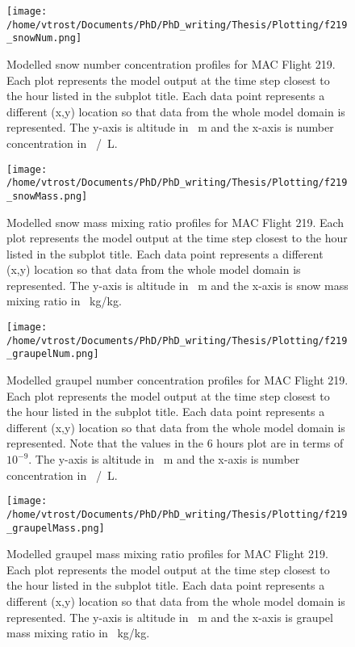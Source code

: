 \begin{figure}[H]
	\centering
	\texttt{[image: /home/vtrost/Documents/PhD/PhD\_writing/Thesis/Plotting/f219\_snowNum.png]}
	\caption{Modelled snow number concentration profiles for MAC Flight 219. Each plot represents the model output at the time step closest to the hour listed in the subplot title. Each data point represents a different (x,y) location so that data from the whole model domain is represented. The y-axis is altitude in \SI{}{m} and the x-axis is number concentration in \SI{}{/L}.}
	\label{fig:moncSnow}
\end{figure}

\begin{figure}[H]
	\centering
	\texttt{[image: /home/vtrost/Documents/PhD/PhD\_writing/Thesis/Plotting/f219\_snowMass.png]}
	\caption{Modelled snow mass mixing ratio profiles for MAC Flight 219. Each plot represents the model output at the time step closest to the hour listed in the subplot title. Each data point represents a different (x,y) location so that data from the whole model domain is represented. The y-axis is altitude in \SI{}{m} and the x-axis is snow mass mixing ratio in \SI{}{kg/kg}.}
\end{figure}

\begin{figure}[H]
	\centering
	\texttt{[image: /home/vtrost/Documents/PhD/PhD\_writing/Thesis/Plotting/f219\_graupelNum.png]}
	\caption{Modelled graupel number concentration profiles for MAC Flight 219. Each plot represents the model output at the time step closest to the hour listed in the subplot title. Each data point represents a different (x,y) location so that data from the whole model domain is represented. Note that the values in the 6 hours plot are in terms of $10^{-9}$. The y-axis is altitude in \SI{}{m} and the x-axis is number concentration in \SI{}{/L}.}
	\label{fig:moncGraupel}
\end{figure}

\begin{figure}[H]
	\centering
	\texttt{[image: /home/vtrost/Documents/PhD/PhD\_writing/Thesis/Plotting/f219\_graupelMass.png]}
	\caption{Modelled graupel mass mixing ratio profiles for MAC Flight 219. Each plot represents the model output at the time step closest to the hour listed in the subplot title. Each data point represents a different (x,y) location so that data from the whole model domain is represented. The y-axis is altitude in \SI{}{m} and the x-axis is graupel mass mixing ratio in \SI{}{kg/kg}.}
\end{figure}

